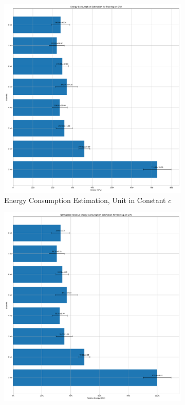         \begin{figure}[H]
            \centering
            \begin{subfigure}[H]{0.48\textwidth}
                \includegraphics[width=\textwidth]{../standard/MNIST/plots/mnist_train_energy_gpu.pdf}
                \caption{Energy Consumption Estimation, Unit in Constant $c$}
            \end{subfigure}
            \hfill
            \begin{subfigure}[H]{0.48\textwidth}
                \includegraphics[width=\textwidth]{../standard/MNIST/plots/mnist_train_relative_energy_gpu.pdf}

\end{subfigure}
\end{figure}
